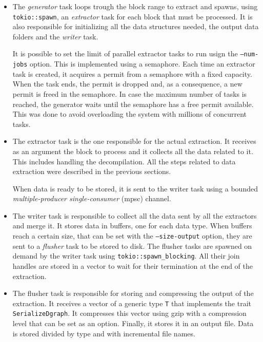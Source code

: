 \begin{itemize}
    \item The \textit{generator} task loops trough the block range to extract and spawns, using \texttt{tokio::spawn}, an \textit{extractor} task for each block that must be processed. It is also responsible for initializing all the data structures needed, the output data folders and the \textit{writer} task. 
    
    It is possible to set the limit of parallel extractor tasks to run usign the \texttt{--num-jobs} option. This is implemented using a semaphore. Each time an extractor task is created, it acquires a permit from a semaphore with a fixed capacity. When the task ends, the permit is dropped and, as a consequence, a new permit is freed in the semaphore. In case the maximum number of tasks is reached, the generator waits until the semaphore has a free permit available. This was done to avoid overloading the system with millions of concurrent tasks.

    \item The extractor task is the one responsible for the actual extraction. It receives as an argument the block to process and it collects all the data related to it. This includes handling the decompilation. All the steps related to data extraction were described in the previous sections.

    When data is ready to be stored, it is sent to the writer task using a bounded \textit{multiple-producer single-consumer} (mpsc) channel.

    \item The writer task is responsible to collect all the data sent by all the extractors and merge it. It stores data in buffers, one for each data type. When buffers reach a certain size, that can be set with the \texttt{--size-output} option, they are sent to a \textit{flusher} task to be stored to disk. The flusher tasks are spawned on demand by the writer task using \texttt{tokio::spawn\_blocking}. All their join handles are stored in a vector to wait for their termination at the end of the extraction.

    \item The flusher task is responsible for storing and compressing the output of the extraction. It receives a vector of a generic type \texttt{T} that implements the trait \texttt{SerializeDgraph}. It compresses this vector using gzip with a compression level that can be set as an option. Finally, it stores it in an output file. Data is stored divided by type and with incremental file names.
\end{itemize}


